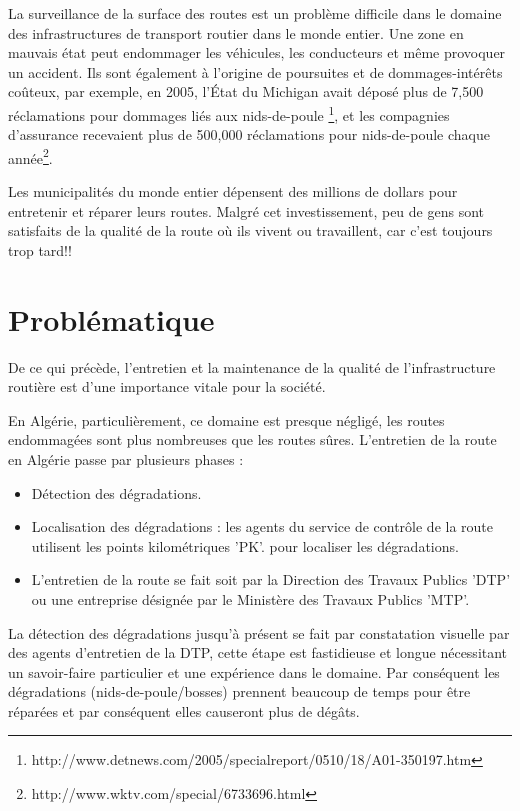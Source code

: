 La surveillance de la surface des routes est un problème difficile dans le domaine des
infrastructures de transport routier dans le monde entier. Une zone en mauvais état peut
endommager les véhicules, les conducteurs et même provoquer un accident.
Ils sont également à l'origine de poursuites et de dommages-intérêts coûteux, par exemple,
en 2005, l'État du Michigan avait déposé plus de 7,500 réclamations pour dommages liés
aux nids-de-poule \footnote{http://www.detnews.com/2005/specialreport/0510/18/A01-350197.htm}, et les
compagnies d'assurance recevaient plus de 500,000 réclamations pour nids-de-poule chaque
année\footnote{http://www.wktv.com/special/6733696.html}.

Les municipalités du monde entier dépensent des millions de dollars pour entretenir et réparer leurs routes.
Malgré cet investissement, peu de gens sont satisfaits de la qualité de la route où ils vivent ou travaillent, car c'est  toujours trop tard!!

\section{Problématique}
De ce qui précède, l'entretien et la maintenance de la qualité de l'infrastructure routière est d'une importance vitale pour la société.

En Algérie, particulièrement, ce domaine est presque négligé, les routes endommagées sont plus nombreuses que les routes sûres.
L'entretien de la route en Algérie  passe par plusieurs phases :

\renewcommand{\labelitemi}{$\bullet$}
\begin{itemize}
  \item Détection des dégradations.
  \item Localisation des dégradations : les agents du service de contrôle de la route utilisent les points kilométriques 'PK'. pour localiser les dégradations.
  \item L'entretien de la route se fait soit par la Direction des Travaux Publics 'DTP' ou une entreprise désignée par le Ministère des Travaux Publics 'MTP'.
\end{itemize}

La détection des dégradations jusqu'à présent se fait par constatation visuelle par des agents d'entretien de la DTP, cette étape est fastidieuse et longue nécessitant un savoir-faire particulier et une expérience dans le domaine. Par conséquent les dégradations (nids-de-poule/bosses) prennent beaucoup de temps pour être réparées et par conséquent elles causeront plus de dégâts.

